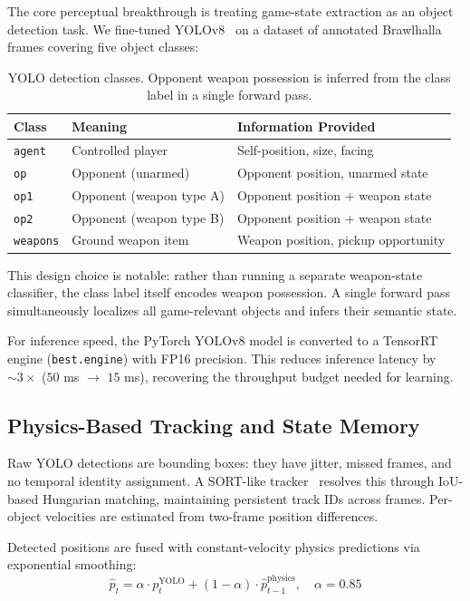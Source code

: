 \documentclass[11pt,a4paper]{article}
\begin{document}
The core perceptual breakthrough is treating game-state extraction as an object detection task.
We fine-tuned YOLOv8~\cite{jocher2023yolov8} on a dataset of annotated Brawlhalla frames covering five object classes:

\begin{table}[h]
\centering
\small
\begin{tabular}{@{}lll@{}}
\toprule
\textbf{Class} & \textbf{Meaning} & \textbf{Information Provided} \\
\midrule
\texttt{agent} & Controlled player & Self-position, size, facing \\
\texttt{op} & Opponent (unarmed) & Opponent position, unarmed state \\
\texttt{op1} & Opponent (weapon type A) & Opponent position + weapon state \\
\texttt{op2} & Opponent (weapon type B) & Opponent position + weapon state \\
\texttt{weapons} & Ground weapon item & Weapon position, pickup opportunity \\
\bottomrule
\end{tabular}
\caption{YOLO detection classes. Opponent weapon possession is inferred from the class label in a single forward pass.}
\end{table}

This design choice is notable: rather than running a separate weapon-state classifier, the class label itself encodes weapon possession.
A single forward pass simultaneously localizes all game-relevant objects and infers their semantic state.

For inference speed, the PyTorch YOLOv8 model is converted to a TensorRT engine (\texttt{best.engine}) with FP16 precision.
This reduces inference latency by ${\sim}3\times$ ($50$ ms $\to$ $15$ ms), recovering the throughput budget needed for learning.

\subsection{Physics-Based Tracking and State Memory}
\label{sec:tracker}

Raw YOLO detections are bounding boxes: they have jitter, missed frames, and no temporal identity assignment.
A SORT-like tracker~\cite{bewley2016simple} resolves this through IoU-based Hungarian matching, maintaining persistent track IDs across frames.
Per-object velocities are estimated from two-frame position differences.

Detected positions are fused with constant-velocity physics predictions via exponential smoothing:
\begin{equation}
\hat{p}_t = \alpha \cdot p_t^{\text{YOLO}} + (1 - \alpha) \cdot \hat{p}_{t-1}^{\text{physics}}, \quad \alpha = 0.85
\label{eq:position-fusion}
\end{equation}
\end{document}
